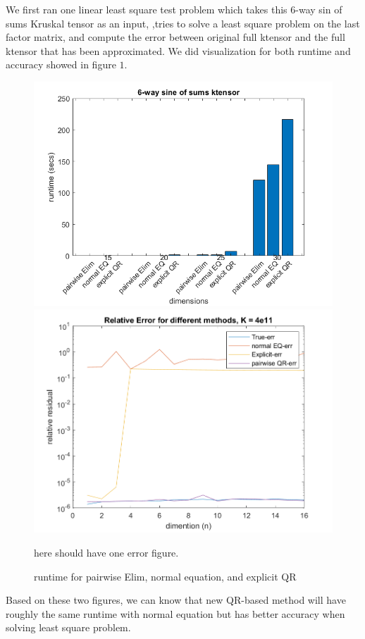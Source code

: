\documentclass{article}
\begin{document}
We first ran one linear least square test problem which takes this 6-way sin of sums Kruskal tensor as an input,
,tries to solve a least square problem on the last factor matrix, and compute the error between original full ktensor 
and the full ktensor that has been approximated. We did visualization for both runtime and accuracy showed in figure $1$.

\begin{figure}[ht!]
  \begin{center}
    \includegraphics*[scale = 0.4]{6way.jpg}
    \includegraphics*[scale = 0.4]{6way_acc.jpg}
    \caption[Figure]{runtime for pairwise Elim, normal equation, and explicit QR}
  \end{center}
here should have one error figure.
\end{figure}
Based on these two figures, we can know that new QR-based method will have roughly the same runtime
with normal equation but has better accuracy when solving least square problem.
\end{document}

